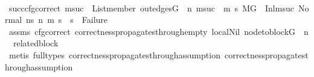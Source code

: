 \begin{isabellebody}
\ \ \ \ \ \ \ \ \ \ \isamarkupfalse%
\ succ{\isacharunderscore}{\kern0pt}cfg{\isacharunderscore}{\kern0pt}correct{\isacharcolon}{\kern0pt}\ {\isachardoublequoteopen}{\isacharparenleft}{\kern0pt}{\isasymforall}msuc{}{\isachardot}{\kern0pt}\ \ List{\isachardot}{\kern0pt}member\ {\isacharparenleft}{\kern0pt}out{\isacharunderscore}{\kern0pt}edges{\isacharparenleft}{\kern0pt}G{\isacharparenright}{\kern0pt}\ {\isacharbang}{\kern0pt}\ n{\isacharparenright}{\kern0pt}\ msuc{}\ {\isasymlongrightarrow}\ {\isacharparenleft}{\kern0pt}{\isasymforall}m{}\ s{}{\isachardot}{\kern0pt}\ {\isacharparenleft}{\kern0pt}{\isacharparenleft}{\kern0pt}M{\isacharcomma}{\kern0pt}{\isasymLambda}{\isacharcomma}{\kern0pt}{\isasymGamma}{\isacharcomma}{\kern0pt}{\isasymOmega}{\isacharcomma}{\kern0pt}G\ {\isasymturnstile}\ {\isacharparenleft}{\kern0pt}Inl{\isacharparenleft}{\kern0pt}msuc{}{\isacharparenright}{\kern0pt}{\isacharcomma}{\kern0pt}\ Normal\ ns{}{\isacharparenright}{\kern0pt}\ {\isacharminus}{\kern0pt}n{\isasymrightarrow}{\isacharasterisk}{\kern0pt}\ {\isacharparenleft}{\kern0pt}m{}{\isacharcomma}{\kern0pt}\ s{}{\isacharparenright}{\kern0pt}{\isacharparenright}{\kern0pt}\ {\isasymlongrightarrow}\ s{}\ {\isasymnoteq}\ Failure{\isacharparenright}{\kern0pt}{\isacharparenright}{\kern0pt}{\isacharparenright}{\kern0pt}{\isachardoublequoteclose}\isanewline
\ \ \ \ \ \ \ \ \ \ \ \ \isamarkupfalse%
\ assms{\isacharparenleft}{\kern0pt}{}{\isacharparenright}{\kern0pt}\ cfg{\isacharunderscore}{\kern0pt}correct\ correctness{\isacharunderscore}{\kern0pt}propagates{\isacharunderscore}{\kern0pt}through{\isacharunderscore}{\kern0pt}empty\ local{\isachardot}{\kern0pt}Nil\ {\isacartoucheopen}node{\isacharunderscore}{\kern0pt}to{\isacharunderscore}{\kern0pt}block{\isacharparenleft}{\kern0pt}G{\isacharparenright}{\kern0pt}\ {\isacharbang}{\kern0pt}\ n\ {\isacharequal}{\kern0pt}\ related{\isacharunderscore}{\kern0pt}block{\isacartoucheclose}\isanewline
\ \ \ \ \ \ \ \ \ \ \ \ \isamarkupfalse%
\ {\isacharparenleft}{\kern0pt}metis\ {\isacharparenleft}{\kern0pt}full{\isacharunderscore}{\kern0pt}types{\isacharparenright}{\kern0pt}\ correctness{\isacharunderscore}{\kern0pt}propagates{\isacharunderscore}{\kern0pt}through{\isacharunderscore}{\kern0pt}assumption\ correctness{\isacharunderscore}{\kern0pt}propagates{\isacharunderscore}{\kern0pt}through{\isacharunderscore}{\kern0pt}assumption{}{\isacharparenright}{\kern0pt}\isanewline

\end{isabellebody}
